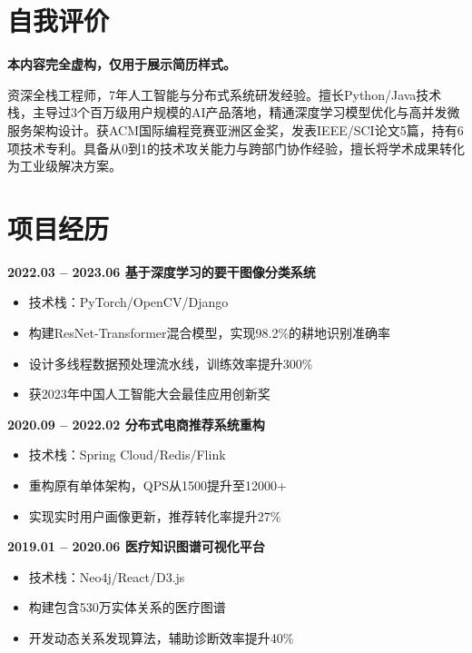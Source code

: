\documentclass{cls/simplecv}
\begin{document}

\maketitle

\section{自我评价}

\textbf{本内容完全虚构，仅用于展示简历样式。}

资深全栈工程师，7年人工智能与分布式系统研发经验。擅长Python/Java技术栈，主导过3个百万级用户规模的AI产品落地，精通深度学习模型优化与高并发微服务架构设计。获ACM国际编程竞赛亚洲区金奖，发表IEEE/SCI论文5篇，持有6项技术专利。具备从0到1的技术攻关能力与跨部门协作经验，擅长将学术成果转化为工业级解决方案。

\section{项目经历}

\textbf{2022.03 -- 2023.06 \quad 基于深度学习的要干图像分类系统}
\begin{itemize}
	\item 技术栈：PyTorch/OpenCV/Django
	\item 构建ResNet-Transformer混合模型，实现98.2\%的耕地识别准确率
	\item 设计多线程数据预处理流水线，训练效率提升300\%
	\item 获2023年中国人工智能大会最佳应用创新奖
\end{itemize}

\textbf{2020.09 -- 2022.02 \quad 分布式电商推荐系统重构}
\begin{itemize}
	\item 技术栈：Spring Cloud/Redis/Flink
	\item 重构原有单体架构，QPS从1500提升至12000+
	\item 实现实时用户画像更新，推荐转化率提升27\%
\end{itemize}

\textbf{2019.01 -- 2020.06 \quad 医疗知识图谱可视化平台}
\begin{itemize}
	\item 技术栈：Neo4j/React/D3.js
	\item 构建包含530万实体关系的医疗图谱
	\item 开发动态关系发现算法，辅助诊断效率提升40\%
\end{itemize}
\end{document}
